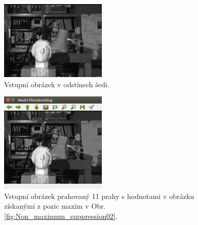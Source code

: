 \documentclass[12pt, a4paper]{article}
\begin{document}
\newpage

\begin{figure}[!ht]
	\centering
	\includegraphics[width=0.45\textwidth]{tsukuba_r.png}
	\caption{Vstupní obrázek v odstínech šedi.}	
	\label{fig:input}
\end{figure}

\begin{figure}[!ht]
	\centering
	\includegraphics[width=0.45\textwidth]{Multi_thresholding.png}
	\caption{Vstupní obrázek prahovaný 11 prahy s hodnotami v obrázku získanými z pozic maxim v Obr. \ref{fig:Non_maximum_suppression02}.}
	\label{fig:Multi_thresholding}
\end{figure}
\end{document}
